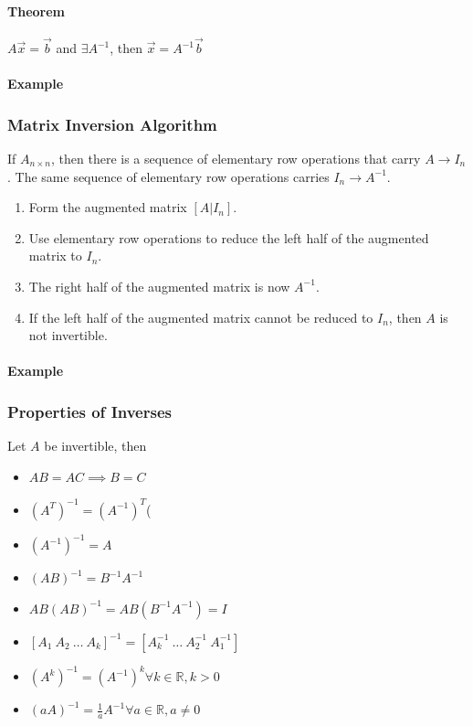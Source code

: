 \paragraph*{Theorem}
$A\vec{x} = \vec{b}$ and $\exists A^{-1}$, then $\vec{x} = A^{-1}\vec{b}$

\paragraph*{Example} %

\subsubsection*{Matrix Inversion Algorithm}
If $A_{n\times n}$, then there is a sequence of elementary row operations that carry $A \rightarrow I_n$.
The same sequence of elementary row operations carries $I_n \rightarrow A^{-1}$.
\begin{enumerate}
    \item Form the augmented matrix $[A | I_n]$.
    \item Use elementary row operations to reduce the left half of the augmented matrix to $I_n$.
    \item The right half of the augmented matrix is now $A^{-1}$.
    \item If the left half of the augmented matrix cannot be reduced to $I_n$, then $A$ is not invertible.
\end{enumerate}

\paragraph*{Example} %

\subsubsection*{Properties of Inverses}
Let $A$ be invertible, then
\begin{itemize}
    \item $AB = AC \implies B = C$
    \item $(A^T)^{-1} = (A^{-1})^T$(
    \item $(A^{-1})^{-1} = A$
    \item $(AB)^{-1} = B^{-1}A^{-1}$
    \item $AB(AB)^{-1} = AB(B^{-1}A^{-1}) = I$
    \item $[A_1\ A_2\ \dots\ A_k]^{-1} = [A_k^{-1}\ \dots\ A_2^{-1}\ A_1^{-1}]$
    \item $(A^k)^{-1} = (A^{-1})^k \forall k \in \mathbb{R}, k > 0$
    \item $(aA)^{-1} = \frac{1}{a}A^{-1} \forall a \in \mathbb{R}, a \neq 0$
\end{itemize}

